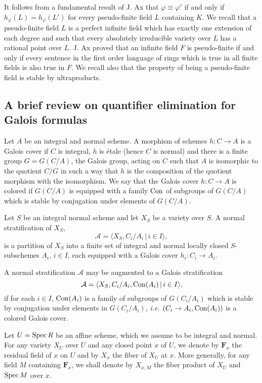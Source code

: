 \documentclass[english,12pt]{amsart}
\def\FF{{\mathbf F}}
\def\cA{{\mathcal A}}
\theoremstyle{definition}
\theoremstyle{remark}
\theoremstyle{plain}
\numberwithin{equation}{subsection}
\def\FF{{\mathbf F}}
\def\cA{{\mathcal A}}
\begin{document}
It follows from a  fundamental result of 
J. Ax \cite{Ax} that
$\varphi \equiv \varphi'$
if and only if 
$h_{\varphi} (L) = h_{\varphi} (L')$
for every
pseudo-finite field $L$
containing $K$.
We recall that a pseudo-finite field
$L$ is a perfect
infinite field which has exactly one extension of each degree
and such that every absolutely irreducible variety over $L$
has a rational point
over
$L$. J. Ax proved \cite{Ax} that an infinite field $F$ is pseudo-finite
if and only if every sentence
in the first order language
of rings which is true in all finite fields is also true in $F$.
We recall also that the property of being a pseudo-finite field
is stable by ultraproducts.



\subsection{A brief review on quantifier elimination for Galois formulas}
Let $A$ be an integral and normal scheme.
A morphism of schemes
$h : C \rightarrow A$ is a
Galois cover if $C$ is integral,
$h$ is {\'e}tale (hence $C$ is normal)
and there is a
finite group $G = G (C  / A)$, the Galois group, acting on $C$ 
such that $A$  is isomorphic to the quotient $C / G$ 
in such a way that
$h$ is the composition of the quotient morphism with the 
isomorphism.
We say that the Galois cover $h : C \rightarrow A$
is colored
if $G (C  / A)$ is equipped with
a family ${\rm Con}$  of subgroups of
$G (C  / A)$ 
which is stable by conjugation under elements of
$G (C  / A)$.




Let $S$ be an integral normal scheme and let $X_{S}$ be a variety
over $S$.
A normal stratification
of $X_{S}$, 
$$
\cA = \langle X_{S}, C_{i} / A_{i} \, \vert \, i \in I \rangle , 
$$
is a partition of $X_{S}$
into a finite
set of integral and normal locally closed $S$-subschemes
$A_{i}$, $i \in I$, each equipped with a 
Galois cover $h_{i} : C_{i} \rightarrow A_{i}$.


A normal stratification $\cA$
may be augmented to a Galois stratification
$$
\cA 
= \langle X_{S}, C_{i} / A_{i}, {\rm Con} (A_{i})
\, \vert \, i \in I \rangle, 
$$
if for each $i \in I$, ${\rm Con} (A_{i})$
is a family of subgroups of
$G (C_{i}  / A_{i})$ 
which is stable by conjugation under elements in $G (C_{i}  / A_{i})$,
{\it i.e.} $(C_{i} \rightarrow A_{i}, {\rm Con} (A_{i}))$
is a colored Galois cover.



Let $U = {\rm Spec} \, R$
be an affine scheme, which we assume to be integral and normal.
For any variety $X_{U}$ over $U$
and any closed point $x$
of $U$, we denote by $\FF_{x}$ the residual field of $x$ on $U$
and by
$X_{x}$ the fiber of $X_{U}$ at $x$.
More generally, for any field $M$ containing $\FF_{x}$, we shall denote by
$X_{x, M}$ the fiber product of $X_{U}$ and ${\rm Spec} \, M$ over $x$.
\end{document}
